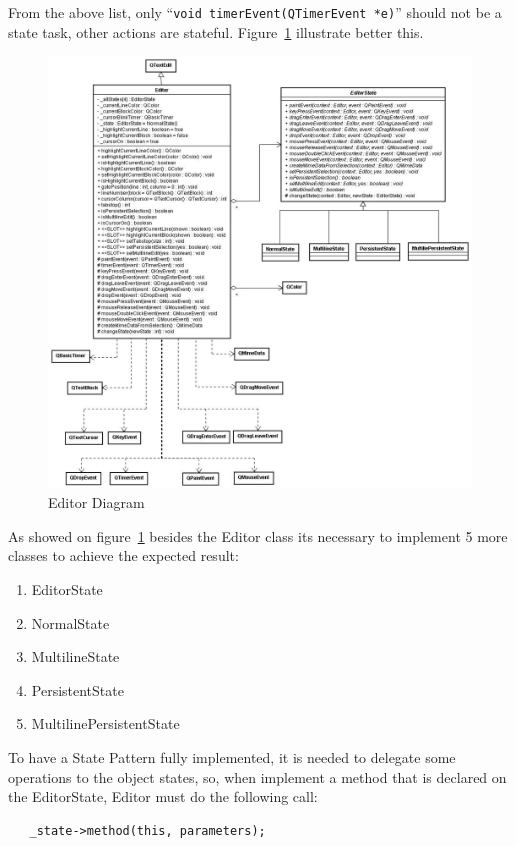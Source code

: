 \documentclass[11pt,a4paper]{report}
\begin{document}
From the above list, only ``\texttt{void timerEvent(QTimerEvent *e)}'' should not be a state task, other actions are stateful. Figure~\ref{editor} illustrate better this.

\begin{figure}[hbt]
\centering
\includegraphics[width=\columnwidth]{images/editor.jpg}
\caption{Editor Diagram} \label{editor}
\end{figure}

As showed on figure~\ref{editor} besides the Editor class its necessary to implement 5 more classes to achieve the expected result:

\begin{enumerate}
\item EditorState
\item NormalState
\item MultilineState
\item PersistentState
\item MultilinePersistentState
\end{enumerate}

To have a State Pattern fully implemented, it is needed to delegate some operations to the object states, so, when implement a method that is declared on the EditorState, Editor must do the following call:

\begin{verbatim}
   _state->method(this, parameters);
\end{verbatim}
\end{document}

